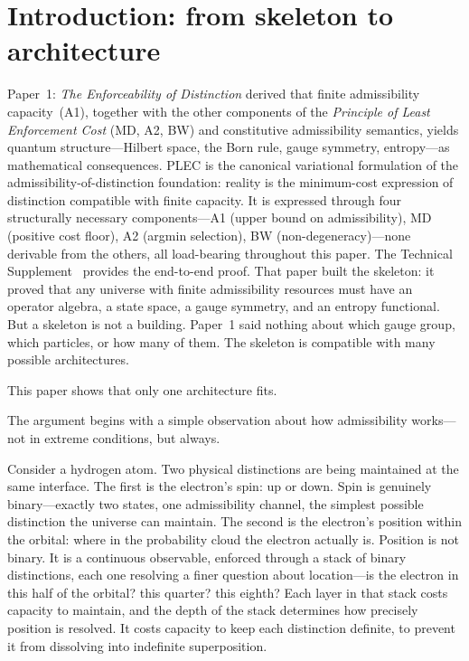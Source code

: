 \documentclass[11pt]{article}
\begin{document}
\section{Introduction: from skeleton to architecture}
\label{sec:intro}

Paper~1: \emph{The Enforceability of Distinction} derived that finite admissibility capacity~(A1), together with the other components of the \emph{Principle of Least Enforcement Cost} (MD, A2, BW) and constitutive admissibility semantics, yields quantum structure---Hilbert space, the Born rule, gauge symmetry, entropy---as mathematical consequences.  PLEC is the canonical variational formulation of the admissibility-of-distinction foundation: reality is the minimum-cost expression of distinction compatible with finite capacity.  It is expressed through four structurally necessary components---A1 (upper bound on admissibility), MD (positive cost floor), A2 (argmin selection), BW (non-degeneracy)---none derivable from the others, all load-bearing throughout this paper.  The Technical Supplement~\cite{BrookeSupplement} provides the end-to-end proof.  That paper built the skeleton: it proved that any universe with finite admissibility resources must have an operator algebra, a state space, a gauge symmetry, and an entropy functional.  But a skeleton is not a building.  Paper~1 said nothing about which gauge group, which particles, or how many of them.  The skeleton is compatible with many possible architectures.

This paper shows that only one architecture fits.

The argument begins with a simple observation about how admissibility works---not in extreme conditions, but always.

Consider a hydrogen atom.  Two physical distinctions are being maintained at the same interface.  The first is the electron's spin: up or down.  Spin is genuinely binary---exactly two states, one admissibility channel, the simplest possible distinction the universe can maintain.  The second is the electron's position within the orbital: where in the probability cloud the electron actually is.  Position is not binary.  It is a continuous observable, enforced through a stack of binary distinctions, each one resolving a finer question about location---is the electron in this half of the orbital? this quarter? this eighth?  Each layer in that stack costs capacity to maintain, and the depth of the stack determines how precisely position is resolved.  It costs capacity to keep each distinction definite, to prevent it from dissolving into indefinite superposition.
\end{document}
